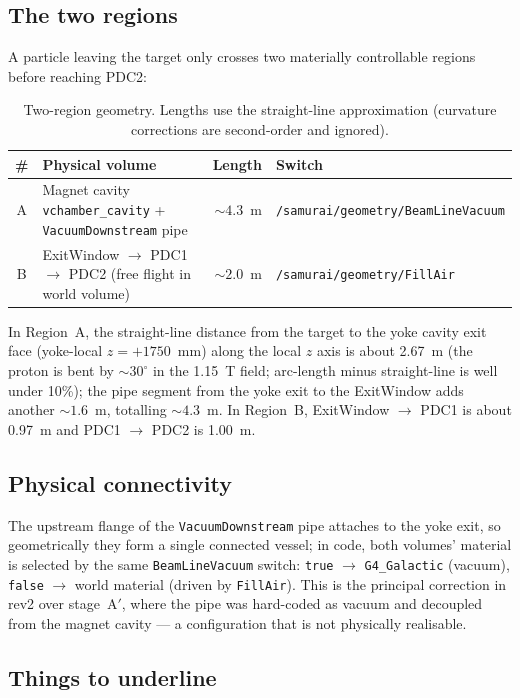 \documentclass[a4paper, 11pt]{article}
\begin{document}
\subsection{The two regions}

A particle leaving the target only crosses two materially controllable regions before reaching PDC2:

\begin{table}[H]
\centering
\caption{Two-region geometry. Lengths use the straight-line approximation (curvature corrections are second-order and ignored).}
\label{tab:path}
\begin{tabular}{clrl}
\toprule
\# & Physical volume & Length & Switch \\
\midrule
A & Magnet cavity \texttt{vchamber\_cavity} + \texttt{VacuumDownstream} pipe & $\sim 4.3$~m & \texttt{/samurai/geometry/BeamLineVacuum} \\
B & ExitWindow $\to$ PDC1 $\to$ PDC2 (free flight in world volume) & $\sim 2.0$~m & \texttt{/samurai/geometry/FillAir}  \\
\bottomrule
\end{tabular}
\end{table}

In Region~A, the straight-line distance from the target to the yoke cavity exit face (yoke-local $z = +1750$~mm) along the local $z$ axis is about 2.67~m (the proton is bent by $\sim 30^\circ$ in the 1.15~T field; arc-length minus straight-line is well under 10\%); the pipe segment from the yoke exit to the ExitWindow adds another $\sim 1.6$~m, totalling $\sim 4.3$~m. In Region~B, ExitWindow $\to$ PDC1 is about 0.97~m and PDC1 $\to$ PDC2 is 1.00~m.

\subsection{Physical connectivity}

The upstream flange of the \texttt{VacuumDownstream} pipe attaches to the yoke exit, so geometrically they form a single connected vessel; in code, both volumes' material is selected by the same \texttt{BeamLineVacuum} switch: \texttt{true} $\to$ \texttt{G4\_Galactic} (vacuum), \texttt{false} $\to$ world material (driven by \texttt{FillAir}). This is the principal correction in rev2 over stage~A$'$, where the pipe was hard-coded as vacuum and decoupled from the magnet cavity --- a configuration that is not physically realisable.

\subsection{Things to underline}
\end{document}
